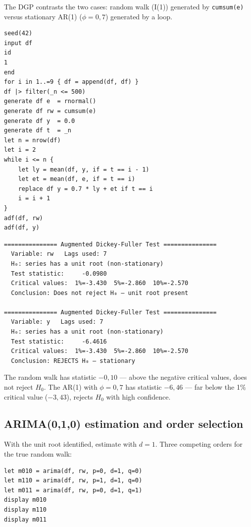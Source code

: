 The DGP contrasts the two cases: random walk (I(1)) generated by
\lstinline{cumsum(e)} versus stationary AR(1) ($\phi=0{,}7$) generated by
a loop.

\begin{lstlisting}[caption={ADF on random walk vs.\ AR(1)}]
seed(42)
input df
id
1
end
for i in 1..=9 { df = append(df, df) }
df |> filter(_n <= 500)
generate df e  = rnormal()
generate df rw = cumsum(e)
generate df y  = 0.0
generate df t  = _n
let n = nrow(df)
let i = 2
while i <= n {
    let ly = mean(df, y, if = t == i - 1)
    let et = mean(df, e, if = t == i)
    replace df y = 0.7 * ly + et if t == i
    i = i + 1
}
adf(df, rw)
adf(df, y)
\end{lstlisting}

\begin{lstlisting}[language={}, basicstyle=\ttfamily\small,
  frame=none, numbers=none, backgroundcolor=\color{codbg},
  xleftmargin=0pt, xrightmargin=0pt, breaklines=false]
=============== Augmented Dickey-Fuller Test ===============
  Variable: rw   Lags used: 7
  H₀: series has a unit root (non-stationary)
  Test statistic:     -0.0980
  Critical values:  1%=-3.430  5%=-2.860  10%=-2.570
  Conclusion: Does not reject H₀ — unit root present

=============== Augmented Dickey-Fuller Test ===============
  Variable: y   Lags used: 7
  H₀: series has a unit root (non-stationary)
  Test statistic:     -6.4616
  Critical values:  1%=-3.430  5%=-2.860  10%=-2.570
  Conclusion: REJECTS H₀ — stationary
\end{lstlisting}

The random walk has statistic $-0{,}10$ --- above the negative critical values, does not
reject $H_0$. The AR(1) with $\phi=0{,}7$
has statistic $-6{,}46$ --- far below the 1\% critical value ($-3{,}43$),
rejects $H_0$ with high confidence.

\subsection*{ARIMA(0,1,0) estimation and order selection}

With the unit root identified, estimate with $d=1$. Three competing orders
for the true random walk:

\begin{lstlisting}[caption={Order selection for I(1) series}]
let m010 = arima(df, rw, p=0, d=1, q=0)
let m110 = arima(df, rw, p=1, d=1, q=0)
let m011 = arima(df, rw, p=0, d=1, q=1)
display m010
display m110
display m011
\end{lstlisting}

